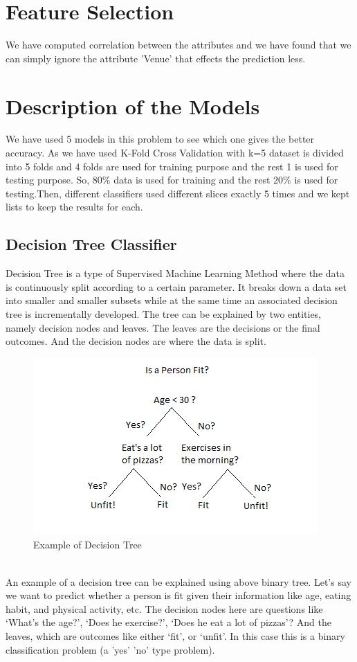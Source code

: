 \documentclass[10pt,a4paper]{article}
\begin{document}
\section{Feature Selection}
We have computed correlation between the attributes and we have found that we can simply ignore the attribute 'Venue' that effects the prediction less.

\section{Description of the Models}
We have used 5 models in this problem to see which one gives the better accuracy. As we have used K-Fold Cross Validation with k=5 dataset is divided into 5 folds and 4 folds are used for training purpose and the rest 1 is used for testing purpose. So, 80\% data is used for training and the rest 20\% is used for testing.Then, different classifiers used different slices exactly 5 times and we kept lists to keep the results for each.

\subsection{Decision Tree Classifier}
\textbf{}Decision Tree is a type of Supervised Machine Learning Method where the data is continuously split according to a certain parameter. It breaks down a data set into smaller and smaller subsets while at the same time an associated decision tree is incrementally developed. The tree can be explained by two entities, namely decision nodes and leaves. The leaves are the decisions or the final outcomes. And the decision nodes are where the data is split.\\
\begin{figure}[]
\centering
\includegraphics[scale=1.00]{Decision-Trees.png}
\caption{Example of Decision Tree~\cite{a}}
\end{figure}\\
An example of a decision tree can be explained using above binary tree. Let’s say we want to predict whether a person is fit given their information like age, eating habit, and physical activity, etc. The decision nodes here are questions like ‘What’s the age?’, ‘Does he exercise?’, ‘Does he eat a lot of pizzas’? And the leaves, which are outcomes like either ‘fit’, or ‘unfit’. In this case this is a binary classification problem (a 'yes' 'no' type problem).
\end{document}
